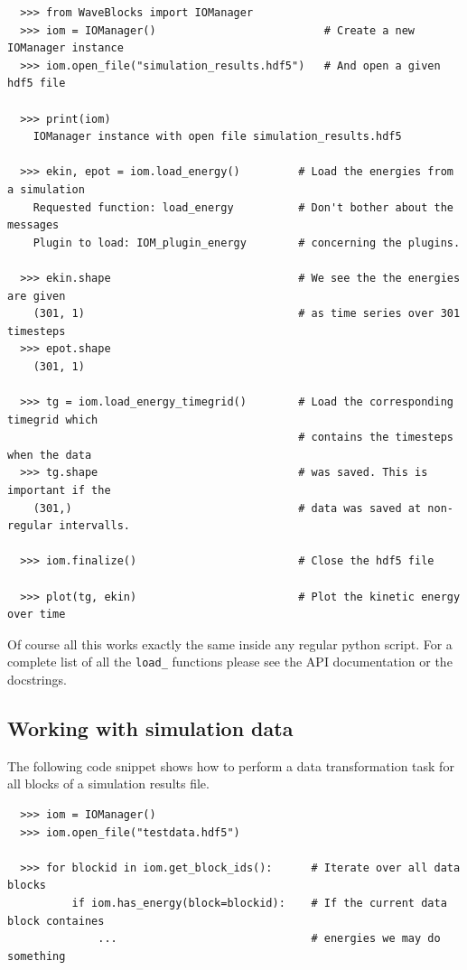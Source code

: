 \documentclass[a4paper,10pt]{report}
\begin{document}
\begin{verbatim}
  >>> from WaveBlocks import IOManager
  >>> iom = IOManager()                          # Create a new IOManager instance
  >>> iom.open_file("simulation_results.hdf5")   # And open a given hdf5 file

  >>> print(iom)
    IOManager instance with open file simulation_results.hdf5

  >>> ekin, epot = iom.load_energy()         # Load the energies from a simulation
    Requested function: load_energy          # Don't bother about the messages
    Plugin to load: IOM_plugin_energy        # concerning the plugins.

  >>> ekin.shape                             # We see the the energies are given
    (301, 1)                                 # as time series over 301 timesteps
  >>> epot.shape
    (301, 1)

  >>> tg = iom.load_energy_timegrid()        # Load the corresponding timegrid which
                                             # contains the timesteps when the data
  >>> tg.shape                               # was saved. This is important if the
    (301,)                                   # data was saved at non-regular intervalls.

  >>> iom.finalize()                         # Close the hdf5 file

  >>> plot(tg, ekin)                         # Plot the kinetic energy over time
\end{verbatim}

Of course all this works exactly the same inside any regular python script.
For a complete list of all the \verb|load_| functions please see the API
documentation or the docstrings.

\subsection{Working with simulation data}

The following code snippet shows how to perform a data transformation task
for all blocks of a simulation results file.

\begin{verbatim}
  >>> iom = IOManager()
  >>> iom.open_file("testdata.hdf5")

  >>> for blockid in iom.get_block_ids():      # Iterate over all data blocks
          if iom.has_energy(block=blockid):    # If the current data block containes
              ...                              # energies we may do something
\end{verbatim}
\end{document}

